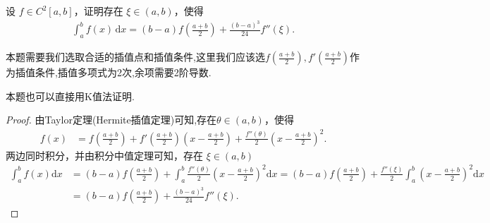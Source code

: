 \documentclass[../../main.tex]{subfiles}
\begin{document}
\begin{example}
设 $f \in C^2[a, b]$，证明存在 $\xi \in (a, b)$，使得
\begin{align*}
\int_a^b f(x) \, \mathrm{d}x = (b - a) f \left( \frac{a + b}{2} \right) + \frac{(b - a)^3}{24} f''(\xi).
\end{align*}
\end{example}
\begin{note}
本题需要我们选取合适的插值点和插值条件,这里我们应该选$f(\frac{a+b}{2}),f'(\frac{a+b}{2})$作为插值条件,插值多项式为2次,余项需要2阶导数.
\end{note}
\begin{remark}
本题也可以直接用K值法证明.
\end{remark}
\begin{proof}
由Taylor定理(Hermite插值定理)可知,存在$\theta \in \left( a,b \right)$，使得
\begin{align*}
f\left( x \right) &= f\left( \frac{a+b}{2} \right) + f'\left( \frac{a+b}{2} \right) \left( x - \frac{a+b}{2} \right) + \frac{f'' \left( \theta \right)}{2}\left( x - \frac{a+b}{2} \right)^2.
\end{align*}
两边同时积分，并由积分中值定理可知，存在 $\xi \in \left( a,b \right)$
\begin{align*}
\int_a^b{f\left( x \right) \mathrm{d}x} &= \left( b-a \right) f\left( \frac{a+b}{2} \right) + \int_a^b{\frac{f'' \left( \theta \right)}{2}\left( x - \frac{a+b}{2} \right)^2 \mathrm{d}x}
= \left( b-a \right) f\left( \frac{a+b}{2} \right) + \frac{f'' \left( \xi \right)}{2} \int_a^b{\left( x - \frac{a+b}{2} \right)^2 \mathrm{d}x} \\
&= \left( b-a \right) f\left( \frac{a+b}{2} \right) + \frac{\left( b-a \right)^3}{24} f'' \left( \xi \right).
\end{align*}
\end{proof}
\end{document}
